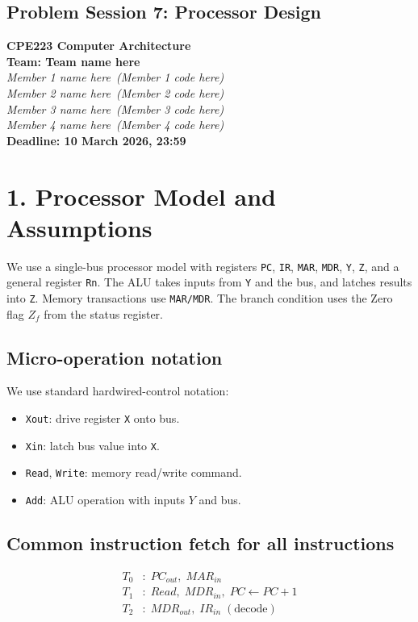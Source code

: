 \documentclass{article}
\newcommand{\TeamName}{Team name here}
\newcommand{\MemberOne}{Member 1 name here}
\newcommand{\MemberOneCode}{Member 1 code here}
\newcommand{\MemberTwo}{Member 2 name here}
\newcommand{\MemberTwoCode}{Member 2 code here}
\newcommand{\MemberThree}{Member 3 name here}
\newcommand{\MemberThreeCode}{Member 3 code here}
\newcommand{\MemberFour}{Member 4 name here}
\newcommand{\MemberFourCode}{Member 4 code here}
\begin{document}
\begin{center}
\section*{Problem Session 7: Processor Design}
\textbf{CPE223 Computer Architecture}\\
\textbf{Team: \TeamName}\\
\textit{\MemberOne\ (\MemberOneCode)}\\
\textit{\MemberTwo\ (\MemberTwoCode)}\\
\textit{\MemberThree\ (\MemberThreeCode)}\\
\textit{\MemberFour\ (\MemberFourCode)}\\
\textbf{Deadline: 10 March 2026, 23:59}
\end{center}

\section*{1. Processor Model and Assumptions}
We use a single-bus processor model with registers \texttt{PC}, \texttt{IR}, \texttt{MAR}, \texttt{MDR}, \texttt{Y}, \texttt{Z}, and a general register \texttt{Rn}. The ALU takes inputs from \texttt{Y} and the bus, and latches results into \texttt{Z}. Memory transactions use \texttt{MAR/MDR}. The branch condition uses the Zero flag \(Z_f\) from the status register.

\subsection*{Micro-operation notation}
We use standard hardwired-control notation:
\begin{itemize}
    \item \texttt{Xout}: drive register \texttt{X} onto bus.
    \item \texttt{Xin}: latch bus value into \texttt{X}.
    \item \texttt{Read}, \texttt{Write}: memory read/write command.
    \item \texttt{Add}: ALU operation with inputs \(Y\) and bus.
\end{itemize}

\subsection*{Common instruction fetch for all instructions}
\begin{align*}
T_0 &: \; PC_{out},\; MAR_{in} \\
T_1 &: \; Read,\; MDR_{in},\; PC \leftarrow PC + 1 \\
T_2 &: \; MDR_{out},\; IR_{in}\; (\text{decode})
\end{align*}
\end{document}
